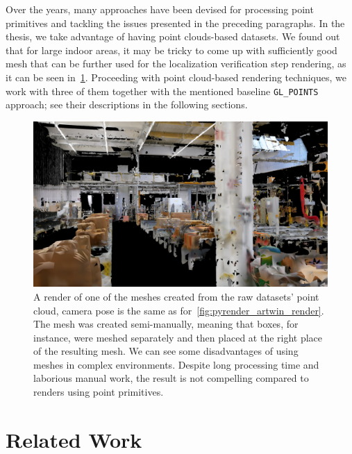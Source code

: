 Over the years, many approaches have been devised for processing point primitives and tackling the
issues presented in the preceding paragraphs. In the thesis, we take advantage of having point clouds-based
datasets. We found out that for large indoor areas, it may be tricky to come up with sufficiently good
mesh that can be further used for the localization verification step rendering, as it can be seen
in~\cref{fig:mesh_artwin_render}. Proceeding with point cloud-based rendering techniques,
we work with three of them together with the mentioned baseline \verb|GL_POINTS| approach;
see their descriptions in the following sections.

\begin{figure}
    \centering
    \includegraphics[width=.9\textwidth]{../graphics/0217_mesh_artwin_render.png}
    \caption[ARTwin mesh rendered view]{A render of one of the meshes created from the raw datasets' point cloud, camera pose is the same
    as for~\cref{fig:pyrender_artwin_render}. The mesh was created
    semi-manually, meaning that boxes, for instance, were meshed separately and then placed at the right
    place of the resulting mesh. We can see some disadvantages of using meshes in complex environments.
    Despite long processing time and laborious manual work, the result is not compelling compared to renders
    using point primitives.}\label{fig:mesh_artwin_render}
\end{figure}

\section{Related Work}

